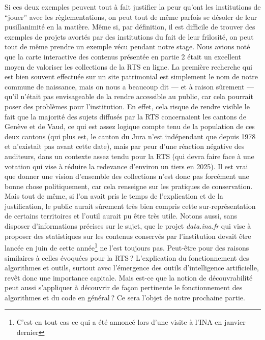 Si ces deux exemples peuvent tout à fait justifier la peur qu’ont les institutions de \enquote{jouer} avec les règlementations, on peut tout de même parfois se désoler de leur pusillanimité en la matière. Même si, par définition, il est difficile de trouver des exemples de projets avortés par des institutions du fait de leur frilosité, on peut tout de même prendre un exemple vécu pendant notre stage. Nous avions noté que la carte interactive des contenus présentée en partie 2 était un excellent moyen de valoriser les collections de la RTS en ligne. La première recherche qui est bien souvent effectuée sur un site patrimonial est simplement le nom de notre commune de naissance, mais on nous a beaucoup dit — et à raison sûrement — qu’il n’était pas envisageable de la rendre accessible au public, car cela pourrait poser des problèmes pour l’institution. En effet, cela risque de rendre visible le fait que la majorité des sujets diffusés par la RTS concernaient les cantons de Genève et de Vaud, ce qui est assez logique compte tenu de la population de ces deux cantons (qui plus est, le canton du Jura n’est indépendant que depuis 1978 et n’existait pas avant cette date), mais par peur d’une réaction négative des auditeurs, dans un contexte assez tendu pour la RTS (qui devra faire face à une votation qui vise à réduire la redevance d'environ un tiers en 2025). Il est vrai que donner une vision d’ensemble des collections n’est donc pas forcément une bonne chose politiquement, car cela renseigne sur les pratiques de conservation. Mais tout de même, si l’on avait pris le temps de l’explication et de la justification, le public aurait sûrement très bien compris cette sur-représentation de certains territoires et l’outil aurait pu être très utile. Notons aussi, sans disposer d’informations précises sur le sujet, que le projet \textit{data.ina.fr} qui vise à proposer des statistiques sur les contenus conservés par l’institution devait être lancée en juin de cette année\footnote{C'est en tout cas ce qui a été annoncé lors d'une visite à l'INA en janvier dernier} ne l’est toujours pas. Peut-être pour des raisons similaires à celles évoquées pour la RTS ? L’explication du fonctionnement des algorithmes et outils, surtout avec l’émergence des outils d’intelligence artificielle, revêt donc une importance capitale. Mais est-ce que la notion de découvrabilité peut aussi s’appliquer à découvrir de façon pertinente le fonctionnement des algorithmes et du code en général ? Ce sera l’objet de notre prochaine partie.


